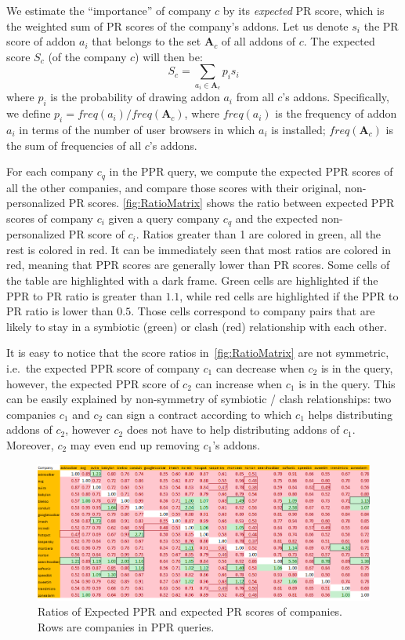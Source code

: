\documentclass[ijoc,nonblindrev]{informs3} %
\numberwithin{equation}{subsection}
\begin{document}
We estimate the ``importance'' of company $c$ by its \emph{expected} PR score, which is the weighted sum of PR scores of the company's addons. Let us denote $s_i$ the PR score of addon $a_i$ that belongs to the set $\mathbf{A}_c$ of all addons of $c$. The expected score $S_c$ (of the company $c$) will then be:
$$
S_c = \sum_{a_i \in \mathbf{A}_c} p_i s_i
$$
where $p_i$ is the probability of drawing addon $a_i$ from all $c$'s addons. Specifically, we define $p_i = freq(a_i) / freq(\mathbf{A}_c)$, where $freq(a_i)$ is the frequency of addon $a_i$ in terms of the number of user browsers in which $a_i$ is installed; $freq(\mathbf{A}_c)$ is the sum of frequencies of all $c$'s addons.

For each company $c_q$ in the PPR query, we compute the expected PPR scores of all the other companies, and compare those scores with their original, non-personalized PR scores. \autoref{fig:RatioMatrix} shows the ratio between expected PPR scores of company $c_i$ given a query company $c_q$ and the expected non-personalized PR score of $c_i$. Ratios greater than 1 are colored in green, all the rest is colored in red. It can be immediately seen that most ratios are colored in red, meaning that PPR scores are generally lower than PR scores. Some cells of the table are highlighted with a dark frame. Green cells are highlighted if the PPR to PR ratio is greater than $1.1$, while red cells are highlighted if the PPR to PR ratio is lower than $0.5$. Those cells correspond to company pairs that are likely to stay in a symbiotic (green) or clash (red) relationship with each other.

It is easy to notice that the score ratios in~\autoref{fig:RatioMatrix} are not symmetric, i.e.~the expected PPR score of company $c_1$ can decrease when $c_2$ is in the query, however, the expected PPR score of $c_2$ can increase when $c_1$ is in the query. This can be easily explained by non-symmetry of symbiotic / clash relationships: two companies $c_1$ and $c_2$ can sign a contract according to which $c_1$ helps distributing addons of $c_2$, however $c_2$ does not have to help distributing addons of $c_1$. Moreover, $c_2$ may even end up removing $c_1$'s addons. 

\begin{figure}[!htbp]
\centering
    \includegraphics[scale=0.7]{figures/RatioMatrixPortrate1.png}
    \caption{Ratios of Expected PPR and expected PR scores of companies. Rows are companies in PPR queries.}
    \label{fig:RatioMatrix}
\end{figure}
\end{document}
